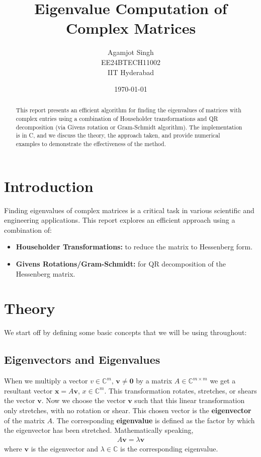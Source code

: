 \documentclass[12pt]{article}
\title{\textbf{Eigenvalue Computation of Complex Matrices}}
\author{Agamjot Singh\\EE24BTECH11002\\IIT Hyderabad}
\date{\today}
\newcommand{\vecb}[1]{\mathbf{#1}}
\newcommand{\defmat}[2]{#1\in\mathbb{C}^{#2\times#2}}
\newcommand{\defvec}[2]{#1\in\mathbb{C}^{#2}}
\begin{document}
\maketitle

\begin{abstract}
This report presents an efficient algorithm for finding the eigenvalues of matrices with complex entries using a combination of Householder transformations and QR decomposition (via Givens rotation or Gram-Schmidt algorithm). The implementation is in C, and we discuss the theory, the approach taken, and provide numerical examples to demonstrate the effectiveness of the method.
\end{abstract}

\section{Introduction}
Finding eigenvalues of complex matrices is a critical task in various scientific and engineering applications. This report explores an efficient approach using a combination of:
\begin{itemize}
    \item \textbf{Householder Transformations:} to reduce the matrix to Hessenberg form.
    \item \textbf{Givens Rotations/Gram-Schmidt:} for QR decomposition of the Hessenberg matrix.
\end{itemize}

\section{Theory}
We start off by defining some basic concepts that we will be using throughout:
\subsection{Eigenvectors and Eigenvalues}
When we multiply a vector $\defvec{v}{m}$, $\vecb{v} \neq \vecb{0}$ by a matrix $\defmat{A}{m}$ we get a resultant vector $\vecb{x} = A\vecb{v}$, $\defvec{x}{m}$. This transformation rotates, stretches, or shears the vector $\vecb{v}$. Now we choose the vector $\vecb{v}$ such that this linear transformation only stretches, with no rotation or shear.
This chosen vector is the \textbf{eigenvector} of the matrix $A$. The corresponding \textbf{eigenvalue} is defined as the factor by which the eigenvector has been stretched.
\newline
Mathematically speaking,
\begin{align}
\label{eigen:1}
    A\vecb{v} = \lambda\vecb{v}
\end{align}
where $\vecb{v}$ is the eigenvector and $\lambda \in \mathbb{C}$ is the corresponding eigenvalue.
\newline
\end{document}
